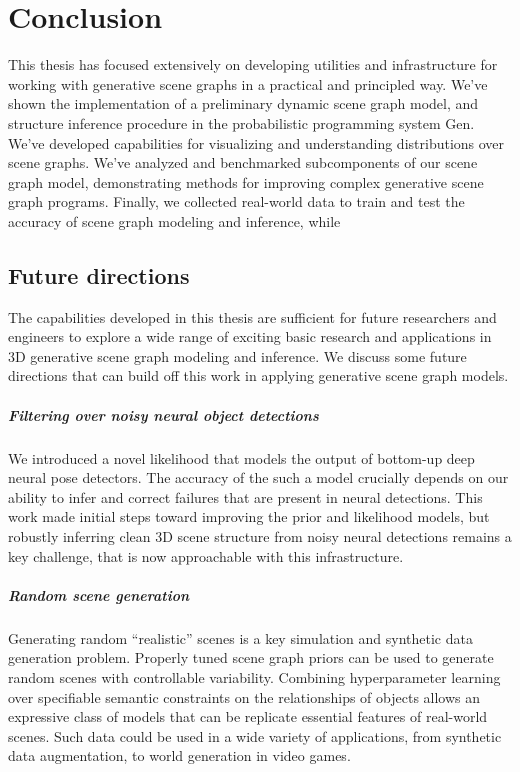 \chapter{Conclusion}
This thesis has focused extensively on developing utilities and infrastructure for working with generative scene graphs in a practical and principled way.
We've shown the implementation of a preliminary dynamic scene graph model, and structure inference procedure in the probabilistic programming system Gen.
We've developed capabilities for visualizing and understanding distributions over scene graphs.
We've analyzed and benchmarked subcomponents of our scene graph model, demonstrating methods for improving complex generative scene graph programs.
Finally, we collected real-world data to train and test the accuracy of scene graph modeling and inference, while 

\section{Future directions}
The capabilities developed in this thesis are sufficient for future researchers and engineers to explore a wide range of exciting basic research and applications in 3D generative scene graph modeling and inference.
We discuss some future directions that can build off this work in applying generative scene graph models.

\paragraph{Filtering over noisy neural object detections}
We introduced a novel likelihood that models the output of bottom-up deep neural pose detectors.
The accuracy of the such a model crucially depends on our ability to infer and correct failures that are present in neural detections.
This work made initial steps toward improving the prior and likelihood models, but robustly inferring clean 3D scene structure from noisy neural detections remains a key challenge, that is now approachable with this infrastructure.

\paragraph{Random scene generation}
Generating random ``realistic'' scenes is a key simulation and synthetic data generation problem.
Properly tuned scene graph priors can be used to generate random scenes with controllable variability.
Combining hyperparameter learning over specifiable semantic constraints on the relationships of objects allows an expressive class of models that can be replicate essential features of real-world scenes.
Such data could be used in a wide variety of applications, from synthetic data augmentation, to world generation in video games.

